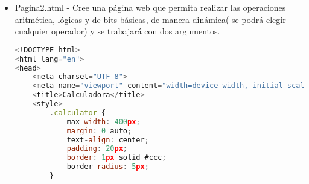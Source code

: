 \documentclass{article}
\begin{document}
\begin{itemize}
            \begin{lstlisting}[language=JavaScript, caption=EJERCICIO\_06A.js]
<!DOCTYPE html>
<html lang="es">
<head>
<meta charset="UTF-8">
<meta name="viewport" content="width=device-width, initial-scale=1.0">
<title>Cambiar Tamaño y Color del Texto</title>
<style>
    #texto {
        font-size: 16px;
        color: black;
    }
</style>
</head>
<body>
<div>
    <h1>Cambiar Tamaño y Color del Texto</h1>
    <p id="texto">Este es un texto de ejemplo.</p>
    <button onclick="cambiarTamaño(1.1)">Aumentar Tamaño</button>
    <button onclick="cambiarTamaño(0.9)">Reducir Tamaño</button>
    <br>
    <button onclick="cambiarColor('red')">Rojo</button>
    <button onclick="cambiarColor('green')">Verde</button>
    <button onclick="cambiarColor('blue')">Azul</button>
    <button onclick="cambiarColor('black')">Negro</button>
</div>

<script>
function cambiarTamaño(factor) {
    const texto = document.getElementById("texto");
    const fontSizeActual = window.getComputedStyle(texto).fontSize;
    const nuevoTamaño = parseFloat(fontSizeActual) * factor;
    texto.style.fontSize = nuevoTamaño + "px";
}

function cambiarColor(color) {
    const texto = document.getElementById("texto");
    texto.style.color = color;
}
</script>
</body>
</html>

            \end{lstlisting}
            
            \newline \newline \newline
            \texttt{[image: CAP6.png]}

            \item Pagina2.html - Cree una página web que permita realizar las operaciones aritmética, lógicas y de bits básicas, de manera dinámica( se podrá elegir cualquier operador) y se trabajará con dos argumentos.

            \begin{lstlisting}[language=JavaScript, caption=EJERCICIO\_06B.js]
<!DOCTYPE html>
<html lang="en">
<head>
    <meta charset="UTF-8">
    <meta name="viewport" content="width=device-width, initial-scale=1.0">
    <title>Calculadora</title>
    <style>
        .calculator {
            max-width: 400px;
            margin: 0 auto;
            text-align: center;
            padding: 20px;
            border: 1px solid #ccc;
            border-radius: 5px;
        }


\end{lstlisting}
\end{itemize}
\end{document}
